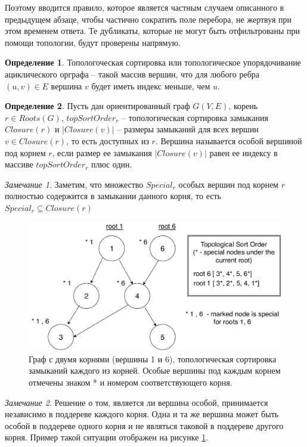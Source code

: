 \documentclass[12pt,a4paper,oneside,openany]{article}
\theoremstyle{definition}
\newtheorem{definition}{Определение}[]
\theoremstyle{lemma}
\theoremstyle{remark}
\newtheorem{remark}{Замечание}[]
\begin{document}
Поэтому вводится правило, которое является частным случаем описанного в предыдущем абзаце,
чтобы частично сократить поле перебора, не жертвуя при этом временем ответа.
Те дубликаты, которые не могут быть отфильтрованы при помощи топологии, будут проверены напрямую.

\begin{definition}
Топологоческая сортировка или топологическое упорядочивание ациклического орграфа -- такой массив вершин, что для любого ребра $(u,v) \in E$ вершина $v$ будет иметь индекс меньше, чем $u$.
\end{definition}

\begin{definition}\label{def:specialnode}
Пусть дан ориентированный граф $G(V,E)$, корень $r \in Roots(G)$, $topSortOrder_r$ --
топологическая сортировка замыкания $Closure(r)$ и $|Closure(v)|$ --
размеры замыканий для всех вершин $v \in Closure(r)$, то есть доступных из $r$.
Вершина называется особой вершиной под корнем $r$, если размер ее замыкания $|Closure(v)|$ равен ее индексу в массиве $topSortOrder_r$ плюс один.
\end{definition}

\begin{remark}
Заметим, что множество $Special_r$ особых вершин под корнем $r$ полностью содержится в замыкании данного корня, то есть $Special_r \subseteq Closure(r)$
\end{remark}

\begin{figure}[H]
      \centering
      \includegraphics[width=0.8\linewidth]{images/special_nodes.pdf}
      \caption{Граф с двумя корнями (вершины 1 и 6), топологическая сортировка замыканий каждого из корней. Особые вершины под каждым корнем отмечены знаком * и номером соответствующего корня.}
      \label{fig:specialnodes}
\end{figure}

\begin{remark}
Решение о том, является ли вершина особой,
принимается независимо в поддереве каждого корня.
Одна и та же вершина может быть особой в поддереве одного корня
и не являться таковой в поддереве другого корня. Пример такой ситуации отображен на рисунке \ref{fig:specialnodes}.
\end{remark}
\end{document}
